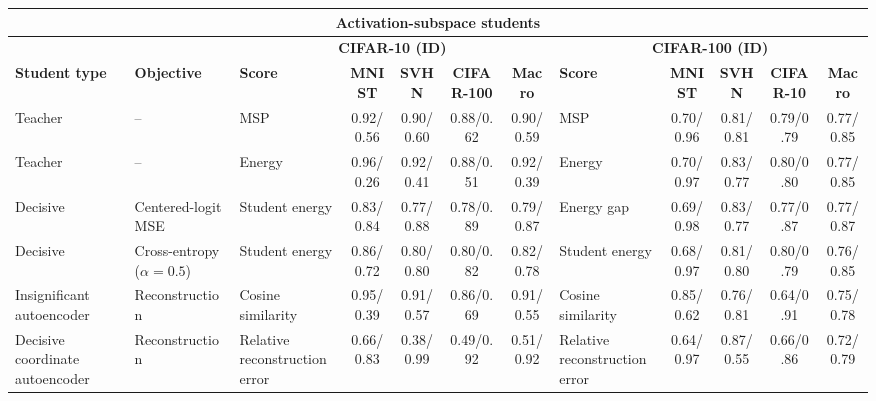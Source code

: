 \documentclass[border=2pt]{standalone}
\begin{document}
\scriptsize
\setlength{\tabcolsep}{3pt}

\begin{tabular}{lllcccclcccc}
\multicolumn{12}{c}{\textbf{Activation-subspace students}}\\[4pt]
\toprule
& & \multicolumn{5}{c}{\textbf{CIFAR-10 (ID)}} & \multicolumn{5}{c}{\textbf{CIFAR-100 (ID)}} \\
\cmidrule(lr){3-7}\cmidrule(lr){8-12}
\textbf{Student type} & \textbf{Objective}
& \textbf{Score} & \textbf{MNIST} & \textbf{SVHN} & \textbf{CIFAR-100} & \textbf{Macro}
& \textbf{Score} & \textbf{MNIST} & \textbf{SVHN} & \textbf{CIFAR-10} & \textbf{Macro} \\
\midrule
Teacher & --
& MSP & 0.92/0.56 & 0.90/0.60 & 0.88/0.62 & 0.90/0.59
& MSP & 0.70/0.96 & 0.81/0.81 & 0.79/0.79 & 0.77/0.85 \\
Teacher & --
& Energy & 0.96/0.26 & 0.92/0.41 & 0.88/0.51 & 0.92/0.39
& Energy & 0.70/0.97 & 0.83/0.77 & 0.80/0.80 & 0.77/0.85 \\
\midrule
Decisive & Centered-logit MSE
& Student energy & 0.83/0.84 & 0.77/0.88 & 0.78/0.89 & 0.79/0.87
& Energy gap & 0.69/0.98 & 0.83/0.77 & 0.77/0.87 & 0.77/0.87 \\
Decisive & Cross-entropy ($\alpha=0.5$)
& Student energy & 0.86/0.72 & 0.80/0.80 & 0.80/0.82 & 0.82/0.78
& Student energy & 0.68/0.97 & 0.81/0.80 & 0.80/0.79 & 0.76/0.85 \\
Insignificant autoencoder & Reconstruction
& Cosine similarity & 0.95/0.39 & 0.91/0.57 & 0.86/0.69 & 0.91/0.55
& Cosine similarity & 0.85/0.62 & 0.76/0.81 & 0.64/0.91 & 0.75/0.78 \\
Decisive coordinate autoencoder & Reconstruction
& Relative reconstruction error & 0.66/0.83 & 0.38/0.99 & 0.49/0.92 & 0.51/0.92
& Relative reconstruction error & 0.64/0.97 & 0.87/0.55 & 0.66/0.86 & 0.72/0.79 \\
\bottomrule
\end{tabular}
\end{document}
